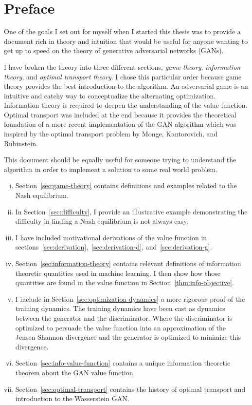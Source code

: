 \section*{Preface}

One of the goals I set out for myself when I started this thesis was
to provide a document rich in theory and intuition that would be
useful for anyone wanting to get up to speed on the theory of
generative adversarial networks (GANs).

I have broken the theory into three different sections, \textit{game
  theory}, \textit{information theory}, and \textit{optimal transport
  theory}.  I chose this particular order because game theory provides
the best introduction to the algorithm.  An adversarial game is an
intuitive and catchy way to conceptualize the alternating
optimization.  Information theory is required to deepen the
understanding of the value function.  Optimal transport was included
at the end because it provides the theoretical foundation of a more
recent implementation of the GAN algorithm which was inspired by the
optimal transport problem by Monge, Kantorovich, and Rubinstein.

This document should be equally useful for someone trying to
understand the algorithm in order to implement a solution to some real
world problem.

\begin{enumerate}[(i)]
\item Section~\ref{sec:game-theory} contains definitions and examples
  related to the Nash equilibrium.
\item In Section~\ref{sec:difficulty}, I provide an illustrative
  example demonstrating the difficulty in finding a Nash equilibrium
  is not always easy.
\item I have included motivational derivations of the value function
  in sections~\ref{sec:derivation},~\ref{sec:derivation-d},
  and~\ref{sec:derivation-g}.
\item Section~\ref{sec:information-theory} contains relevant
  definitions of information theoretic quantities used in machine
  learning. I then show how those quantities are found in the value
  function in Section~\ref{thm:info-objective}.
\item I include in Section~\ref{sec:optimization-dynamics} a more
  rigorous proof of the training dynamics.  The training dynamics have
  been cast as dynamics between the generator and the discriminator.
  Where the discriminator is optimized to persuade the value function
  into an approximation of the Jensen-Shannon divergence and the
  generator is optimized to minimize this divergence.
\item Section~\ref{sec:info-value-function} contains a unique
  information theoretic theorem about the GAN value function.
\item Section~\ref{sec:optimal-transport} contains the history of
  optimal transport and introduction to the Wasserstein GAN.
\end{enumerate}

